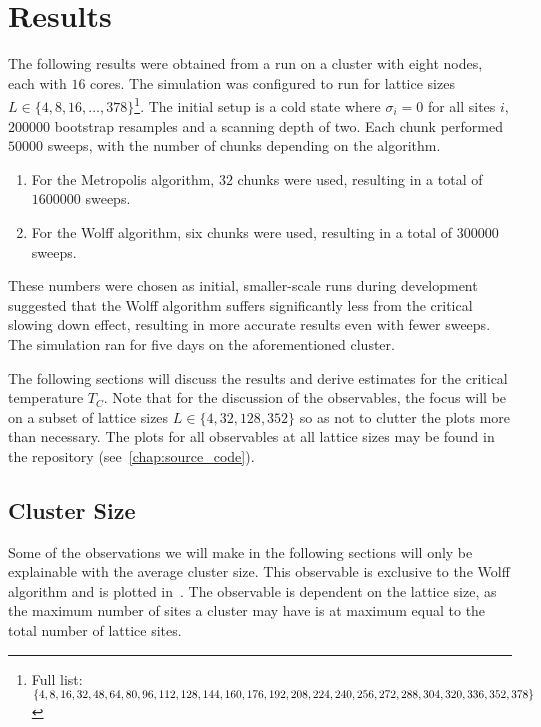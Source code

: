 \chapter{Results}
	The following results were obtained from a run on a cluster with eight nodes, each with $16$ cores. The simulation was configured to run for lattice sizes $L \in \{4, 8, 16, \dots, 378\}$\footnote{Full list: $\{4, 8, 16, 32, 48, 64, 80, 96, 112, 128, 144, 160, 176, 192, 208, 224, 240, 256, 272, 288, 304, 320,\\336, 352, 378\}$}. The initial setup is a cold state where $\sigma_i = 0$ for all sites $i$, $\num{200000}$ bootstrap resamples and a scanning depth of two. Each chunk performed $\num{50000}$ sweeps, with the number of chunks depending on the algorithm.
	\begin{enumerate}
		\item For the Metropolis algorithm, $\num{32}$ chunks were used, resulting in a total of $\num{1600000}$ sweeps.
		\item For the Wolff algorithm, six chunks were used, resulting in a total of $\num{300000}$ sweeps.
	\end{enumerate}
	These numbers were chosen as initial, smaller-scale runs during development suggested that the Wolff algorithm suffers significantly less from the critical slowing down effect, resulting in more accurate results even with fewer sweeps. The simulation ran for five days on the aforementioned cluster.
	
	The following sections will discuss the results and derive estimates for the critical temperature $T_C$. Note that for the discussion of the observables, the focus will be on a subset of lattice sizes $L \in \{4, 32, 128, 352\}$ so as not to clutter the plots more than necessary. The plots for all observables at all lattice sizes may be found in the repository (see~\cref{chap:source_code}).
	
	\section{Cluster Size}\label{sec:res:cluster_size}
		Some of the observations we will make in the following sections will only be explainable with the average cluster size. This observable is exclusive to the Wolff algorithm and is plotted in~. The observable is dependent on the lattice size, as the maximum number of sites a cluster may have is at maximum equal to the total number of lattice sites.
		
